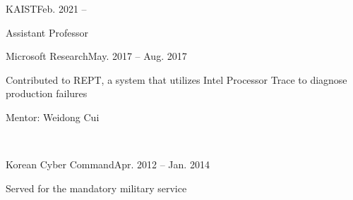 \documentclass[11pt,letterpaper]{article}
\begin{document}
%
%

\begin{topic}{KAIST}{Feb. 2021 --}
\item Assistant Professor
\end{topic}
\begin{topic}{Microsoft Research}{May. 2017 -- Aug. 2017}
\item Contributed to REPT, a system that utilizes Intel Processor Trace to diagnose production failures
  \item Mentor:  Weidong Cui
\end{topic}
 \\
\begin{topic}{Korean Cyber Command}{Apr. 2012 -- Jan. 2014}
  \item Served for the mandatory military service
\end{topic}
\end{document}
